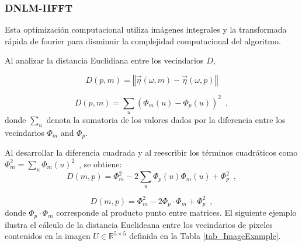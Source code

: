 \subsubsection{DNLM-IIFFT}
\label{ch:marco_dnlmifft}

Esta optimizaci\'on computacional utiliza im\'agenes integrales y la transformada r\'apida de fourier para disminuir la complejidad computacional del algoritmo. 



Al analizar la distancia Euclidiana entre los vecindarios $D$,

\begin{equation}
D\left(p,m\right)=\left\Vert \vec{\eta}\left(\omega,m\right)-\vec{\eta}\left(\omega,p\right)\right\Vert
\end{equation}

\begin{equation}
D\left(p,m\right)=\sum_{u}\left(\varPhi_{m}\left(u\right)-\varPhi_{p}\left(u\right)\right)^{2} \enspace ,
\end{equation}
 donde $\sum_{u}$ denota la sumatoria de los valores dados por la diferencia entre los vecindarios $\varPhi_m$ and $\varPhi_p$.

Al desarrollar la diferencia cuadrada y al reescribir los t\'erminos cuadr\'aticos como $\varPhi_{m}^{2}=\sum_{u}\varPhi_{m}\left(u\right)^{2} \enspace$,  se obtiene: 
\begin{equation}
 D\left(m,p\right)=\varPhi_{m}^{2}-2\sum_{u}\varPhi_{p}\left(u\right)\varPhi_{m}\left(u\right)+\varPhi_{p}^{2}  \enspace ,
 \label{eq_cuadratica}
\end{equation}


\begin{equation}
D\left(m,p\right)=\varPhi_{m}^{2}-2\varPhi_{p}\cdot\varPhi_{m}+\varPhi_{p}^{2} \enspace ,
\end{equation}
donde $\varPhi_{p}\cdot\varPhi_{m}$ corresponde al producto punto entre matrices. El siguiente ejemplo ilustra el c\'alculo de la distancia Euclideana entre los vecindarios de pixeles contenidos en la imagen $U\in\mathbb{R}^{5\times5}$ definida en la Tabla \ref{tab_ImageExample}.








